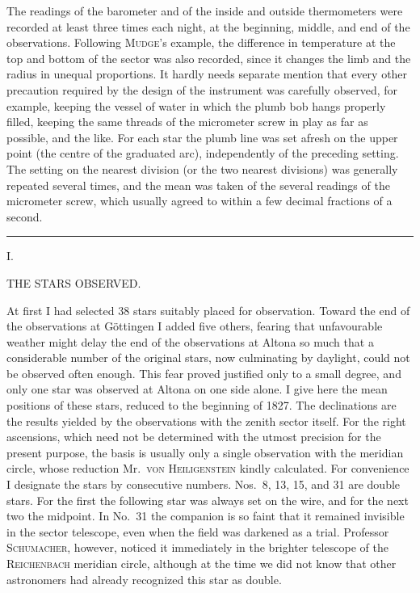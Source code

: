 The readings of the barometer and of the inside and outside thermometers were recorded at
least three times each night, at the beginning, middle, and end of the observations.
Following \textsc{Mudge}'s example, the difference in temperature at the top and bottom of
the sector was also recorded, since it changes the limb and the radius in unequal proportions.
It hardly needs separate mention that every other precaution required by the design of the
instrument was carefully observed, for example, keeping the vessel of water in which the plumb
bob hangs properly filled, keeping the same threads of the micrometer screw in play as far as
possible, and the like. For each star the plumb line was set afresh on the upper point
(the centre of the graduated arc), independently of the preceding setting. The setting on the
nearest division (or the two nearest divisions) was generally repeated several times, and the
mean was taken of the several readings of the micrometer screw, which usually agreed to within
a few decimal fractions of a second.

\begin{center}\rule{.24\textwidth}{.4pt}\end{center}

\clearpage
\vspace*{18mm}
\begin{center}
{\large I.}\par\medskip
{\Large THE STARS OBSERVED.}
\end{center}

At first I had selected 38 stars suitably placed for observation. Toward the end of the
observations at Göttingen I added five others, fearing that unfavourable weather might delay
the end of the observations at Altona so much that a considerable number of the original stars,
now culminating by daylight, could not be observed often enough. This fear proved justified
only to a small degree, and only one star was observed at Altona on one side alone. I give here
the mean positions of these stars, reduced to the beginning of 1827. The declinations are the
results yielded by the observations with the zenith sector itself. For the right ascensions,
which need not be determined with the utmost precision for the present purpose, the basis
is usually only a single observation with the meridian circle, whose reduction Mr.\
\textsc{von Heiligenstein} kindly calculated. For convenience I designate the stars by
consecutive numbers. Nos.\ 8, 13, 15, and 31 are double stars. For the first the following star
was always set on the wire, and for the next two the midpoint. In No.\ 31 the companion is so
faint that it remained invisible in the sector telescope, even when the field was darkened
as a trial. Professor \textsc{Schumacher}, however, noticed it immediately in the brighter
telescope of the \textsc{Reichenbach} meridian circle, although at the time we did not know
that other astronomers had already recognized this star as double.

